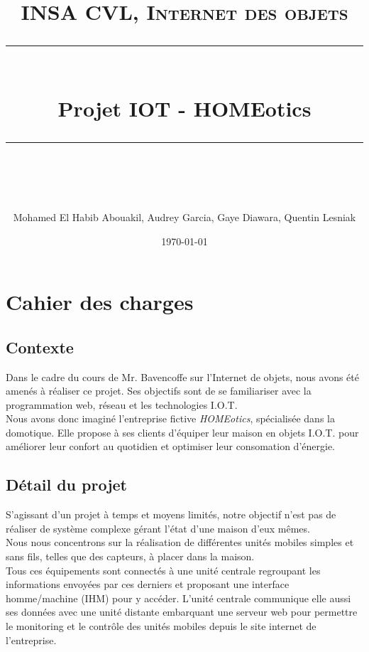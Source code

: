 \documentclass[11pt]{scrartcl} %
\title{	
	\normalfont\normalsize
	\vspace{\fill} %
	\textsc{INSA CVL, Internet des objets}\\ %
	\vspace{25pt} %
	\rule{\linewidth}{0.5pt}\\ %
	\vspace{20pt} %
	{\huge Projet IOT - HOMEotics}\\ %
	\vspace{12pt} %
	\rule{\linewidth}{2pt}\\ %
	\vspace{12pt} %
}
\author{Mohamed El Habib Abouakil, Audrey Garcia, Gaye Diawara, Quentin Lesniak} %
\date{\normalsize\today\vspace{\fill}} %
\begin{document}
\maketitle %
\newpage


\section{Cahier des charges}

\subsection{Contexte}

Dans le cadre du cours de Mr. Bavencoffe sur l'Internet de objets, nous avons été amenés à réaliser ce projet. Ses objectifs sont de se familiariser avec la programmation web, réseau et les technologies I.O.T.\\
Nous avons donc imaginé l'entreprise fictive \textit{HOMEotics}, spécialisée dans la domotique. Elle propose à ses clients d'équiper leur maison en objets I.O.T. pour améliorer leur confort au quotidien et optimiser leur consomation d'énergie.


\subsection{Détail du projet}

S'agissant d'un projet à temps et moyens limités, notre objectif n'est pas de réaliser de système complexe gérant l'état d'une maison d'eux mêmes.\\
Nous nous concentrons sur la réalisation de différentes unités mobiles simples et sans fils, telles que des capteurs, à placer dans la maison.\\
Tous ces équipements sont connectés à une unité centrale regroupant les informations envoyées par ces derniers et proposant une interface homme/machine (IHM) pour y accéder.
L'unité centrale communique elle aussi ses données avec une unité distante embarquant une serveur web pour permettre le monitoring et le contrôle des unités mobiles depuis le site internet de l'entreprise.

\end{document}
